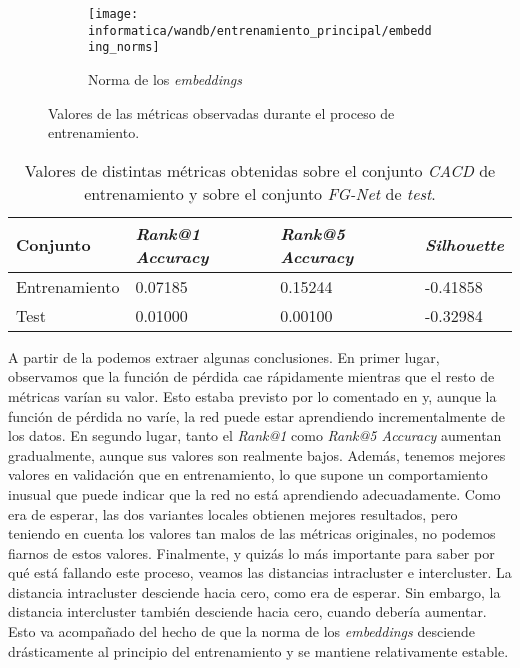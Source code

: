 \begin{figure}[!hbtp]
    \begin{subfigure}[t]{0.45\textwidth}
        \texttt{[image: informatica/wandb/entrenamiento\_principal/embedding\_norms]}
        \caption{Norma de los \textit{embeddings}}
    \end{subfigure}

    \caption{Valores de las métricas observadas durante el proceso de entrenamiento.}
    \label{img:metricas_entrenamiento}
\end{figure}

\begin{table}[!hbtp]
\centering
\begin{tabular}{|l|l|l|l|}
    \hline
    Conjunto & \textit{Rank@1 Accuracy} & \textit{Rank@5 Accuracy} & \textit{Silhouette} \\
    \hline

    Entrenamiento & 0.07185 & 0.15244 & -0.41858 \\
    Test & 0.01000 & 0.00100 & -0.32984 \\
    \hline

\end{tabular}
\caption{Valores de distintas métricas obtenidas sobre el conjunto \textit{CACD} de entrenamiento y sobre el conjunto \textit{FG-Net} de \textit{test}.}
    \label{table:resultados_sobre_fg_net}
\end{table}

A partir de la  podemos extraer algunas conclusiones. En primer lugar, observamos que la función de pérdida cae rápidamente mientras que el resto de métricas varían su valor. Esto estaba previsto por lo comentado en \cite{informatica:principal} y, aunque la función de pérdida no varíe, la red puede estar aprendiendo incrementalmente de los datos. En segundo lugar, tanto el \textit{Rank@1} como \textit{Rank@5 Accuracy} aumentan gradualmente, aunque sus valores son realmente bajos. Además, tenemos mejores valores en validación que en entrenamiento, lo que supone un comportamiento inusual que puede indicar que la red no está aprendiendo adecuadamente. Como era de esperar, las dos variantes locales obtienen mejores resultados, pero teniendo en cuenta los valores tan malos de las métricas originales, no podemos fiarnos de estos valores. Finalmente, y quizás lo más importante para saber por qué está fallando este proceso, veamos las distancias intracluster e intercluster. La distancia intracluster desciende hacia cero, como era de esperar. Sin embargo, la distancia intercluster también desciende hacia cero, cuando debería aumentar. Esto va acompañado del hecho de que la norma de los \textit{embeddings} desciende drásticamente al principio del entrenamiento y se mantiene relativamente estable.

